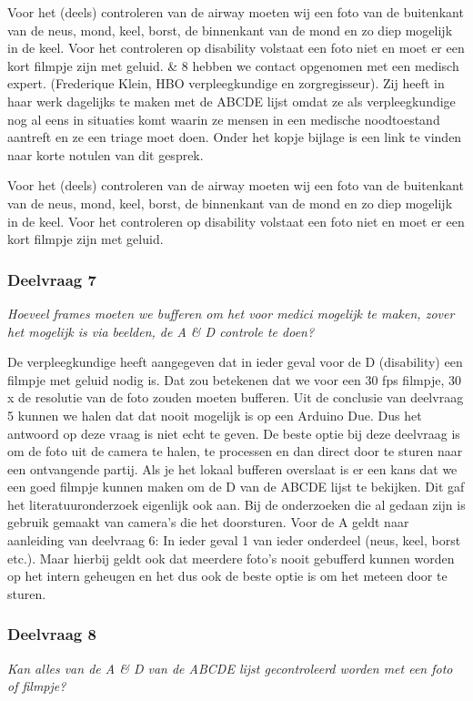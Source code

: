 \documentclass{article}
\begin{document}
Voor het (deels) controleren van de airway moeten wij een foto van de buitenkant van de neus, mond, keel, borst, de binnenkant van de mond en zo diep mogelijk in de keel. 
Voor het controleren op disability volstaat een foto niet en moet er een kort filmpje zijn met geluid.
\& 8 hebben we contact opgenomen met een medisch expert. (Frederique Klein, HBO verpleegkundige en zorgregisseur). Zij heeft in haar werk dagelijks te maken met de ABCDE lijst omdat ze als verpleegkundige nog al eens in situaties komt waarin ze mensen in een medische noodtoestand aantreft en ze een triage moet doen. Onder het kopje bijlage is een link te vinden naar korte notulen van dit gesprek. 

Voor het (deels) controleren van de airway moeten wij een foto van de buitenkant van de neus, mond, keel, borst, de binnenkant van de mond en zo diep mogelijk in de keel. Voor het controleren op disability volstaat een foto niet en moet er een kort filmpje zijn met geluid.

\subsubsection{Deelvraag 7}
\textit{Hoeveel frames moeten we bufferen om het voor medici mogelijk te maken, zover het mogelijk is via beelden, de A \& D controle te doen?}

De verpleegkundige heeft aangegeven dat in ieder geval voor de D (disability) een filmpje met geluid nodig is. Dat zou betekenen dat we voor een 30 fps filmpje, 30 x de resolutie van de foto zouden moeten bufferen. Uit de conclusie van deelvraag 5 kunnen we halen dat dat nooit mogelijk is op een Arduino Due. Dus het antwoord op deze vraag is niet echt te geven. 
De beste optie bij deze deelvraag is om de foto uit de camera te halen, te processen en dan direct door te sturen naar een ontvangende partij. Als je het lokaal bufferen overslaat is er een kans dat we een goed filmpje kunnen maken om de D van de ABCDE lijst te bekijken. Dit gaf het literatuuronderzoek eigenlijk ook aan. Bij de onderzoeken die al gedaan zijn is gebruik gemaakt van camera’s die het doorsturen.
Voor de A geldt naar aanleiding van deelvraag 6: In ieder geval 1 van ieder onderdeel (neus, keel, borst etc.). Maar hierbij geldt ook dat meerdere foto’s nooit gebufferd kunnen worden op het intern geheugen en het dus ook de beste optie is om het meteen door te sturen.


\subsubsection{Deelvraag 8}
\textit{Kan alles van de A \& D van de ABCDE lijst gecontroleerd worden met een foto of filmpje? }
\end{document}
